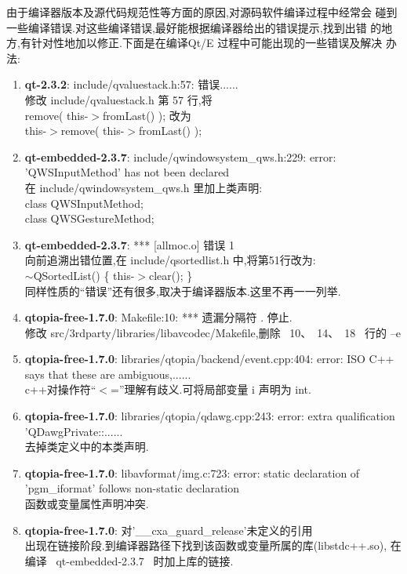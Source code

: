 	由于编译器版本及源代码规范性等方面的原因,对源码软件编译过程中经常会
碰到一些编译错误.对这些编译错误,最好能根据编译器给出的错误提示,找到出错
的地方,有针对性地加以修正.下面是在编译Qt/E 过程中可能出现的一些错误及解决
办法:
\begin{enumerate}\itemsep=-3pt
  \item {\bf qt-2.3.2}: include/qvaluestack.h:57: 错误......\\
		修改 include/qvaluestack.h 第 57 行,将\\
		remove( this-$>$fromLast() ); 改为\\
		this-$>$remove( this-$>$fromLast() );
  \item {\bf qt-embedded-2.3.7}: include/qwindowsystem\_qws.h:229: error:
		'QWSInputMethod' has not been declared\\
		在 include/qwindowsystem\_qws.h 里加上类声明:\\
		class   QWSInputMethod;\\
		class   QWSGestureMethod;
  \item {\bf qt-embedded-2.3.7}: *** [allmoc.o] 错误 1\\
		向前追溯出错位置,在 include/qsortedlist.h 中,将第51行改为:\\
		$\sim$QSortedList() \{ this-$>$clear(); \}\\
		同样性质的``错误''还有很多,取决于编译器版本.这里不再一一列举.
  \item {\bf qtopia-free-1.7.0}: Makefile:10: *** 遗漏分隔符 . 停止.\\
		修改 src/3rdparty/libraries/libavcodec/Makefile,删除 ~10、~14、~18~
		行的 --e
  \item {\bf qtopia-free-1.7.0}: libraries/qtopia/backend/event.cpp:404:
		error: ISO C++ says that these are ambiguous,......\\
		c++对操作符``$<$=''理解有歧义.可将局部变量 i 声明为 int.
  \item {\bf qtopia-free-1.7.0}: libraries/qtopia/qdawg.cpp:243: error:
		extra qualification 'QDawgPrivate::......\\
		去掉类定义中的本类声明.
  \item {\bf qtopia-free-1.7.0}: libavformat/img.c:723: error: static
		declaration of 'pgm\_iformat' follows non-static declaration\\
		函数或变量属性声明冲突.
  \item {\bf qtopia-free-1.7.0}: 对'\_\_cxa\_guard\_release'未定义的引用\\
		出现在链接阶段.到编译器路径下找到该函数或变量所属的库(libstdc++.so),
		在编译 ~qt-embedded-2.3.7~ 时加上库的链接.
\end{enumerate}
\rm
